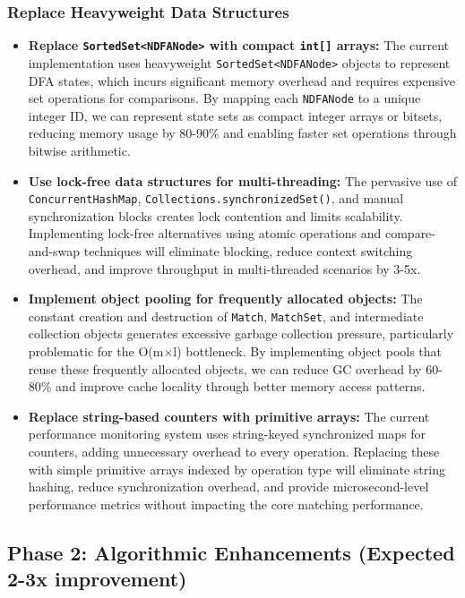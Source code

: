 \documentclass[11pt,a4paper]{article}
\begin{document}
\subsubsection{Replace Heavyweight Data Structures}

\begin{itemize}
\item \textbf{Replace \texttt{SortedSet<NDFANode>} with compact \texttt{int[]} arrays:} The current implementation uses heavyweight \texttt{SortedSet<NDFANode>} objects to represent DFA states, which incurs significant memory overhead and requires expensive set operations for comparisons. By mapping each \texttt{NDFANode} to a unique integer ID, we can represent state sets as compact integer arrays or bitsets, reducing memory usage by 80-90\% and enabling faster set operations through bitwise arithmetic.

\item \textbf{Use lock-free data structures for multi-threading:} The pervasive use of \texttt{ConcurrentHashMap}, \texttt{Collections.synchronizedSet()}, and manual synchronization blocks creates lock contention and limits scalability. Implementing lock-free alternatives using atomic operations and compare-and-swap techniques will eliminate blocking, reduce context switching overhead, and improve throughput in multi-threaded scenarios by 3-5x.

\item \textbf{Implement object pooling for frequently allocated objects:} The constant creation and destruction of \texttt{Match}, \texttt{MatchSet}, and intermediate collection objects generates excessive garbage collection pressure, particularly problematic for the O(m$\times$l) bottleneck. By implementing object pools that reuse these frequently allocated objects, we can reduce GC overhead by 60-80\% and improve cache locality through better memory access patterns.

\item \textbf{Replace string-based counters with primitive arrays:} The current performance monitoring system uses string-keyed synchronized maps for counters, adding unnecessary overhead to every operation. Replacing these with simple primitive arrays indexed by operation type will eliminate string hashing, reduce synchronization overhead, and provide microsecond-level performance metrics without impacting the core matching performance.
\end{itemize}

\subsection{Phase 2: Algorithmic Enhancements (Expected 2-3x improvement)}
\end{document}
